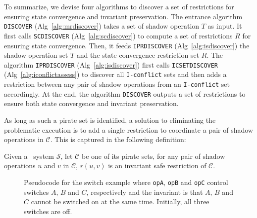 To summarize, we devise four algorithms to discover a set of restrictions for ensuring state convergence
and invariant preservation. The entrance algorithm \texttt{DISCOVER} (Alg~\ref{alg:mrdiscover}) takes 
a set of shadow operation $T$ as input. It first
calls \texttt{SCDISCOVER} (Alg~\ref{alg:scdiscover}) to compute a set of restrictions $R$
for ensuring state convergence. Then, it feeds \texttt{IPRDISCOVER} (Alg~\ref{alg:isdiscover}) the shadow operation
set $T$ and the state convergence restriction set $R$. The algorithm \texttt{IPRDISCOVER} (Alg~\ref{alg:isdiscover}) first calls
\texttt{ICSETDISCOVER} (Alg~\ref{alg:iconflictassess}) to discover all {\tt I-conflict} sets and then adds a restriction between any
pair of shadow operations from an {\tt I-conflict} set accordingly. At the end, the algorithm \texttt{DISCOVER} outputs a 
set of restrictions to ensure both state convergence and invariant preservation. 





As long as such a pirate set is identified, a solution to eliminating the 
problematic execution is to add a single restriction
to coordinate a pair of shadow operations in $\mathcal{C}$.
This is captured in the following definition:

\begin{mydef}
 Given a \PRCAJ\ system $\mathscr{S}$, let 
$\mathcal{C}$ be one of
its pirate sets, for any pair of shadow operations $u$ and $v$ in $\mathcal{C}$, 
$r(u, v)$ is an invariant safe restriction of $\mathcal{C}$.
\label{def:saferestric}
\end{mydef}


\fi

\begin{figure}[t!]
\begin{minipage}[t]{0.3\columnwidth}
\centering
{}
\end{minipage}
\hspace{2mm}
\begin{minipage}[t]{0.3\columnwidth}
\end{minipage}
\hspace{2mm}
\begin{minipage}[t]{0.3\columnwidth}
\centering
{}
\end{minipage}
\caption{Pseudocode for the switch example where \texttt{opA}, \texttt{opB} and \texttt{opC}
control switches $A$, $B$ and $C$, respectively and the invariant is that $A$,
$B$ and $C$ cannot be switched on at the same time. Initially, all three switches are off.}
\label{fig:por:threeops}
\end{figure}


